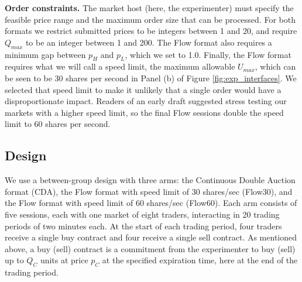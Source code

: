 \documentclass[12pt]{article}
\begin{document}
\bigskip
\noindent
\textbf{Order constraints.} 
The market host (here, the experimenter) must specify the feasible price range and the maximum order size that can be processed.
For both formats we restrict submitted prices to be integers between 1 and 20, and require $Q_{max}$ to be an integer between 1 and 200. 
The Flow format also requires a minimum gap between $p_H$ and $p_L$, which we set to 1.0. 
Finally, the Flow format requires what we will call a speed limit, the maximum allowable $U_{max}$, which can be seen to be 30 shares per second in Panel (b) of Figure \ref{fig:exp_interfaces}. 
We selected that speed limit to make it unlikely that a single order would have a disproportionate impact.
Readers of an early draft suggested stress testing our markets with a higher speed limit, so the final Flow sessions double the speed limit to 60 shares per second.


\subsection{Design}\label{sect:design}

We use a between-group design with three arms: the Continuous Double Auction format (CDA), the Flow format with speed limit of 30 shares/sec (Flow30), and the Flow format with speed limit of 60 shares/sec (Flow60).
Each arm consists of five sessions, each with one market of eight traders, interacting in 20 trading periods of two minutes each. 
At the start of each trading period,  four traders receive a single buy contract and four receive a single sell contract. %
As mentioned above, %
a buy (sell) contract is a commitment from the experimenter to buy (sell) up to $Q_{C}$ units at price $p_{C}$ at the specified expiration time, here at the end of the trading period. %
\end{document}
